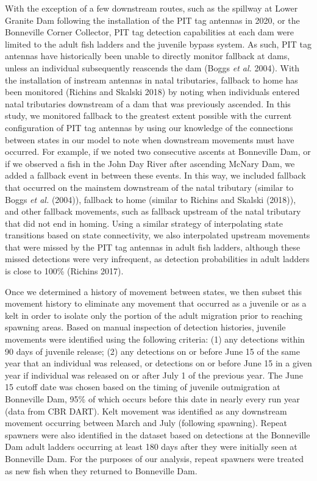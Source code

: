 \documentclass[
  12pt,
]{report}
\begin{document}
With the exception of a few downstream routes, such as the spillway at
Lower Granite Dam following the installation of the PIT tag antennas in
2020, or the Bonneville Corner Collector, PIT tag detection capabilities
at each dam were limited to the adult fish ladders and the juvenile
bypass system. As such, PIT tag antennas have historically been unable
to directly monitor fallback at dams, unless an individual subsequently
reascends the dam (Boggs \emph{et al.} 2004). With the installation of
instream antennas in natal tributaries, fallback to home has been
monitored (Richins and Skalski 2018) by noting when individuals entered
natal tributaries downstream of a dam that was previously ascended. In
this study, we monitored fallback to the greatest extent possible with
the current configuration of PIT tag antennas by using our knowledge of
the connections between states in our model to note when downstream
movements must have occurred. For example, if we noted two consecutive
ascents at Bonneville Dam, or if we observed a fish in the John Day
River after ascending McNary Dam, we added a fallback event in between
these events. In this way, we included fallback that occurred on the
mainstem downstream of the natal tributary (similar to Boggs \emph{et
al.} (2004)), fallback to home (similar to Richins and Skalski (2018)),
and other fallback movements, such as fallback upstream of the natal
tributary that did not end in homing. Using a similar strategy of
interpolating state transitions based on state connectivity, we also
interpolated upstream movements that were missed by the PIT tag antennas
in adult fish ladders, although these missed detections were very
infrequent, as detection probabilities in adult ladders is close to
100\% (Richins 2017).

Once we determined a history of movement between states, we then subset
this movement history to eliminate any movement that occurred as a
juvenile or as a kelt in order to isolate only the portion of the adult
migration prior to reaching spawning areas. Based on manual inspection
of detection histories, juvenile movements were identified using the
following criteria: (1) any detections within 90 days of juvenile
release; (2) any detections on or before June 15 of the same year that
an individual was released, or detections on or before June 15 in a
given year if individual was released on or after July 1 of the previous
year. The June 15 cutoff date was chosen based on the timing of juvenile
outmigration at Bonneville Dam, 95\% of which occurs before this date in
nearly every run year (data from CBR DART). Kelt movement was identified
as any downstream movement occurring between March and July (following
spawning). Repeat spawners were also identified in the dataset based on
detections at the Bonneville Dam adult ladders occurring at least 180
days after they were initially seen at Bonneville Dam. For the purposes
of our analysis, repeat spawners were treated as new fish when they
returned to Bonneville Dam.
\end{document}
